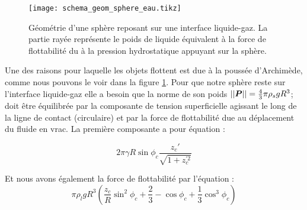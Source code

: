         \begin{figure}[!htb]
            \centering
            \texttt{[image: schema\_geom\_sphere\_eau.tikz]}
            \caption{Géométrie d'une sphère reposant sur une interface liquide-gaz. La partie rayée représente le poids de liquide équivalent à la force de flottabilité du à la pression hydrostatique appuyant sur la sphère. }
            \label{geom_sphere}
        \end{figure}

        Une des raisons pour laquelle les objets flottent est due à la poussée d'Archimède, comme nous pouvons le voir dans la figure \ref{geom_sphere}. Pour que notre sphère reste sur l'interface liquide-gaz elle a besoin que la norme de son poids \(||\vb*{P}||=\frac{4}{3}\pi\rho_{s}gR^3\); doit être équilibrée par la composante de tension superficielle agissant le long de la ligne de contact (circulaire) et par la force de flottabilité due au déplacement du fluide en vrac. La première composante a pour équation :

        \begin{equation}
            2\pi\gamma R\sin{\phi_c}\frac{z_c'}{\sqrt{1+z_c^{'2}}}
            \label{eq:tensionSuperficielle}
        \end{equation}

        Et nous avons également la force de flottabilité par l'équation :
        \begin{equation}
            \pi\rho_l g R^3 \left(\frac{z_c}{R}\sin^2{\phi_c} + \frac{2}{3}-\cos{\phi_c}+\frac{1}{3}\cos^3{\phi_c}\right)
            \label{eq:buoyancyForce}
        \end{equation}


